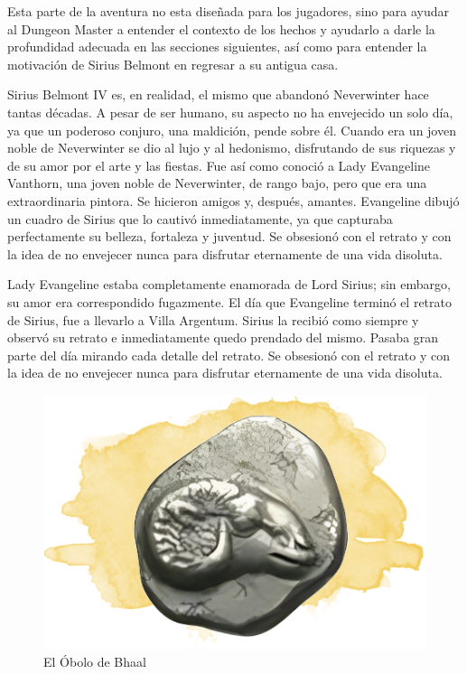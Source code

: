 \documentclass[10pt,twoside,twocolumn,openany]{dndbook}
\begin{document}
Esta parte de la aventura no esta diseñada para los jugadores, sino para ayudar al Dungeon Master a 
entender el contexto de los hechos y ayudarlo a darle la profundidad adecuada en las secciones 
siguientes, así como para entender la motivación de Sirius Belmont en regresar a su antigua casa.

Sirius Belmont IV es, en realidad, el mismo que abandonó Neverwinter hace tantas 
décadas. A pesar de ser humano, su aspecto no ha envejecido un solo día, ya que un poderoso conjuro, 
una maldición, pende sobre él. Cuando era un joven noble de Neverwinter se dio al lujo y al 
hedonismo, disfrutando de sus riquezas y de su amor por el arte y las fiestas. Fue así como conoció
a Lady Evangeline Vanthorn, una joven noble de Neverwinter, de rango bajo, pero que era una 
extraordinaria pintora. Se hicieron amigos y, después, amantes. Evangeline dibujó un cuadro de 
Sirius que lo cautivó inmediatamente, ya que capturaba perfectamente su belleza, fortaleza y 
juventud. Se obsesionó con el retrato y con la idea de no envejecer nunca para disfrutar 
eternamente de una vida disoluta.

Lady Evangeline estaba completamente enamorada de Lord Sirius; sin embargo, su amor era 
correspondido fugazmente. El día que Evangeline terminó el retrato de Sirius, fue a llevarlo a
Villa Argentum. Sirius la recibió como siempre y observó su retrato e inmediatamente quedo 
prendado del mismo. Pasaba gran parte del día mirando cada detalle del retrato.
Se obsesionó con el retrato y con la idea de no envejecer nunca para disfrutar eternamente de una
vida disoluta.

\begin{figure}
  \centering
  \includegraphics[width=0.9\columnwidth]{media/obolo-bhaal.png}
  \caption{El Óbolo de Bhaal}
\end{figure}
\end{document}
